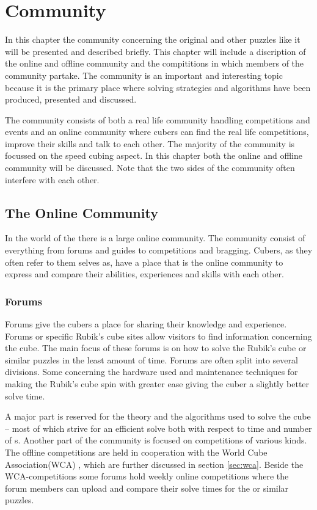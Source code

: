 \chapter{Community}
\startTop{}
In this chapter the community concerning the original \rubik{} and other puzzles like it will be presented and described briefly. This chapter will include a discription of the online and offline community and the compititions in which members of the community partake. The community is an important and interesting topic because it is the primary place where solving strategies and algorithms have been produced, presented and discussed. 
\stopTop{}

The \rubik{} community consists of both a real life community handling competitions and events and an online community where cubers can find the real life competitions, improve their skills and talk to each other. The majority of the community is focussed on the speed cubing aspect. In this chapter both the online and offline community will be discussed. Note that the two sides of the community often interfere with each other. 

\section{The Online Community}
In the world of the \rubik{} there is a large online community. The community consist of everything from forums and guides to competitions and bragging. Cubers, as they often refer to them selves as, have a place that is the online community to express and compare their abilities, experiences and skills with each other. 

\subsection{Forums}
Forums give the cubers a place for sharing their knowledge and experience\cite{speedsolving.com}\cite{speedcubing.dk}\cite{wca}. Forums or specific Rubik's cube sites allow visitors to find information concerning the cube. The main focus of these forums is on how to solve the Rubik's cube or similar puzzles in the least amount of time. Forums are often split into several divisions. Some concerning the hardware used and maintenance techniques for making the Rubik's cube spin with greater ease giving the cuber a slightly better solve time.

A major part is reserved for the theory and the algorithms used to solve the cube -- most of which strive for an efficient solve both with respect to time and number of \twist{}s.
Another part of the community is focused on competitions of various kinds. The offline competitions are held in cooperation with the World Cube Association(WCA) \cite{wca}, which are further discussed in section \ref{sec:wca}. Beside the WCA-competitions some forums hold weekly online competitions where the forum members can upload and compare their solve times for the \rubik{} or similar puzzles. 

